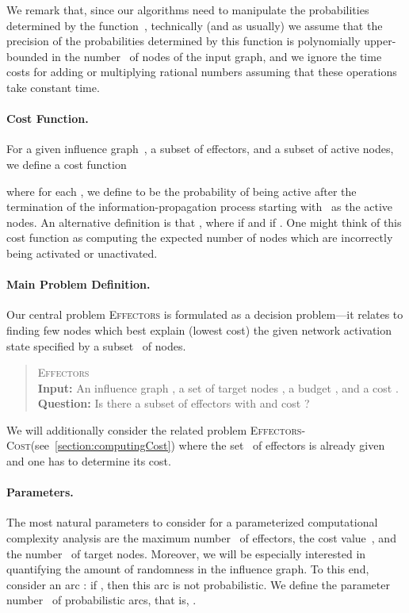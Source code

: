 \documentclass{article}
\newcommand{\probDef}[3]{
  \begin{quote}
    #1 \\
    \textbf{Input:} #2 \\
    \textbf{Question:} #3
  \end{quote}
}
\newcommand{\probEffectors}{\textsc{Effectors}\xspace}
\newcommand{\probCost}{\textsc{Effectors-Cost}\xspace}
\begin{document}
We remark that,
since our algorithms need to manipulate the probabilities determined by the function~,
technically (and as usually)
we assume that the precision of the probabilities determined by this function 
is polynomially upper-bounded in the number~ of nodes of the input graph,
and we ignore the time costs for adding or multiplying rational numbers assuming that these operations take constant time.



\paragraph{Cost Function.}
For a given influence graph~,
a subset  of effectors,
and a subset  of active nodes,
we define a cost function

where for each , we define  to be the probability of
 being active after the termination of the information-propagation process starting
with~ as the active nodes.
An alternative definition is that ,
where  if  and  if .
One might think of this cost function as computing the expected number of nodes
which are incorrectly being activated or unactivated.


\paragraph{Main Problem Definition.}
Our central problem \probEffectors is formulated as a decision problem---it 
relates to finding few nodes which best explain (lowest cost) the given 
network activation state specified by a subset~ of nodes.
\probDef
  {\probEffectors}
  {An influence graph , a set of target nodes , a budget , and a cost .}
  {Is there a subset  of effectors with  and cost ?}
We will additionally consider the related problem 
\probCost (see~\autoref{section:computingCost}) where the set~ 
of effectors 
is already given and one has to determine its cost.

\paragraph{Parameters.}
The most natural parameters to consider for a parameterized computational complexity 
analysis are the maximum number~ of
effectors, the cost value~, and the number~ of target nodes.
Moreover, we will be especially interested in quantifying the amount of
randomness in the influence graph.
To this end, consider an arc :
if ,
then this arc is not probabilistic.
We define the parameter number~ of probabilistic arcs, that is,
.
\end{document}
